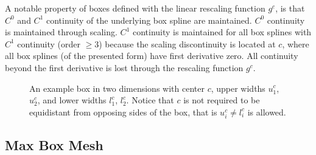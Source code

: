 A notable property of boxes defined with the linear rescaling function $g^c$, is that $C^0$ and $C^1$ continuity of the underlying box spline are maintained. $C^0$ continuity is maintained through scaling. $C^1$ continuity is maintained for all box splines with $C^1$ continuity (order $\geq 3$) because the scaling discontinuity is located at $c$, where all box splines (of the presented form) have first derivative zero. All continuity beyond the first derivative is lost through the rescaling function $g^c$.

\begin{figure}
  \centering
  \caption{An example box in two dimensions with center $c$, upper widths $u^c_1$, $u^c_2$, and lower widths $l^c_1$, $l^c_2$. Notice that $c$ is not required to be equidistant from opposing sides of the box, that is $u^c_i \not= l^c_i$ is allowed.}
  \label{fig_example_box}
\end{figure}

\subsection{Max Box Mesh}

